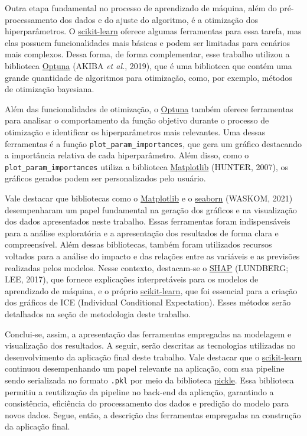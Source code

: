 \documentclass[
  12pt,
  a4paper,
]{scrreprt}
\begin{document}
Outra etapa fundamental no processo de aprendizado de máquina, além do
pré-processamento dos dados e do ajuste do algoritmo, é a otimização dos
hiperparâmetros. O \href{https://scikit-learn.org/stable/}{scikit-learn}
oferece algumas ferramentas para essa tarefa, mas elas possuem
funcionalidades mais básicas e podem ser limitadas para cenários mais
complexos. Dessa forma, de forma complementar, esse trabalho utilizou a
biblioteca \href{https://optuna.org/}{Optuna} (AKIBA \emph{et al.},
2019), que é uma biblioteca que contém uma grande quantidade de
algoritmos para otimização, como, por exemplo, métodos de otimização
bayesiana.

\vspace{12pt}

Além das funcionalidades de otimização, o
\href{https://optuna.org/}{Optuna} também oferece ferramentas para
analisar o comportamento da função objetivo durante o processo de
otimização e identificar os hiperparâmetros mais relevantes. Uma dessas
ferramentas é a função \texttt{plot\_param\_importances}, que gera um
gráfico destacando a importância relativa de cada hiperparâmetro. Além
disso, como o \texttt{plot\_param\_importances} utiliza a biblioteca
\href{https://matplotlib.org/}{Matplotlib} (HUNTER, 2007), os gráficos
gerados podem ser personalizados pelo usuário.

\vspace{12pt}

Vale destacar que bibliotecas como o
\href{https://matplotlib.org/}{Matplotlib} e o
\href{https://seaborn.pydata.org/}{seaborn} (WASKOM, 2021) desempenharam
um papel fundamental na geração dos gráficos e na visualização dos dados
apresentados neste trabalho. Essas ferramentas foram indispensáveis para
a análise exploratória e a apresentação dos resultados de forma clara e
compreensível. Além dessas bibliotecas, também foram utilizados recursos
voltados para a análise do impacto e das relações entre as variáveis e
as previsões realizadas pelos modelos. Nesse contexto, destacam-se o
\href{https://shap.readthedocs.io/en/latest}{SHAP} (LUNDBERG; LEE,
2017), que fornece explicações interpretáveis para os modelos de
aprendizado de máquina, e o próprio
\href{https://scikit-learn.org/stable/}{scikit-learn}, que foi essencial
para a criação dos gráficos de ICE (Individual Conditional Expectation).
Esses métodos serão detalhados na seção de metodologia deste trabalho.

\vspace{12pt}

Conclui-se, assim, a apresentação das ferramentas empregadas na
modelagem e visualização dos resultados. A seguir, serão descritas as
tecnologias utilizadas no desenvolvimento da aplicação final deste
trabalho. Vale destacar que o
\href{https://scikit-learn.org/stable/}{scikit-learn} continuou
desempenhando um papel relevante na aplicação, com sua pipeline sendo
serializada no formato \texttt{.pkl} por meio da biblioteca
\href{https://docs.python.org/3/library/pickle.html}{pickle}. Essa
biblioteca permitiu a reutilização da pipeline no back-end da aplicação,
garantindo a consistência, eficiência do processamento dos dados e
predição do modelo para novos dados. Segue, então, a descrição das
ferramentas empregadas na construção da aplicação final.
\end{document}
